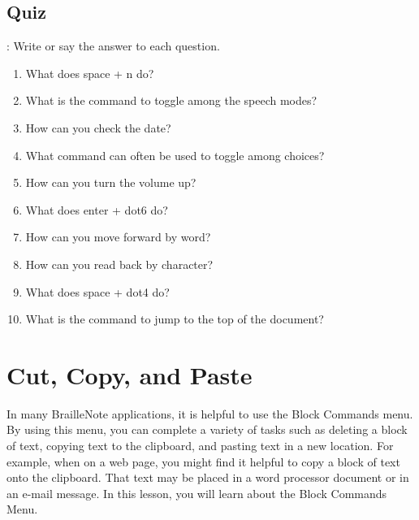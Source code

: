 \documentclass[10pt,letterpaper,twoside]{report}
\begin{document}
\subsection{Quiz}:
Write or say the answer to each question.
\begin{enumerate}
	\item What does space + n do?
	\item What is the command to toggle among the speech modes?
	\item How can you check the date?
	\item What command can often be used to toggle among choices?
	\item How can you turn the volume up?
	\item What does enter + dot6 do?
	\item How can you move forward by word?
	\item How can you read back by character?
	\item What does space + dot4 do?
	\item What is the command to jump to the top of the document?
\end{enumerate}
\clearpage 
\section{Cut, Copy, and Paste}
In many BrailleNote applications, it is helpful to use the Block Commands menu. By using this menu, you can complete a variety of tasks such as deleting a block of text, copying text to the clipboard, and pasting text in a new location. For example, when on a web page, you might find it helpful to copy a block of text onto the clipboard. That text may be placed in a word processor document or in an e-mail message. In this lesson, you will learn about the Block Commands Menu.
\end{document}
